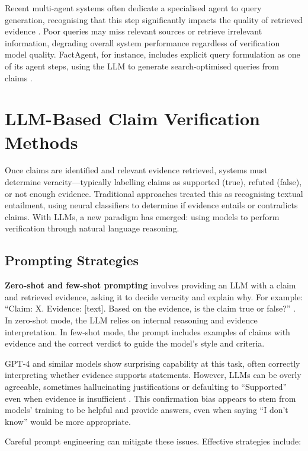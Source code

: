 \documentclass[12pt,a4paper]{article}
\begin{document}
Recent multi-agent systems often dedicate a specialised agent to query generation, recognising that this step significantly impacts the quality of retrieved evidence \citep{hysonlab2025factagent}. Poor queries may miss relevant sources or retrieve irrelevant information, degrading overall system performance regardless of verification model quality. FactAgent, for instance, includes explicit query formulation as one of its agent steps, using the LLM to generate search-optimised queries from claims \citep{hysonlab2025factagent}.

\section{LLM-Based Claim Verification Methods}

Once claims are identified and relevant evidence retrieved, systems must determine veracity—typically labelling claims as supported (true), refuted (false), or not enough evidence. Traditional approaches treated this as recognising textual entailment, using neural classifiers to determine if evidence entails or contradicts claims. With LLMs, a new paradigm has emerged: using models to perform verification through natural language reasoning.

\subsection{Prompting Strategies}

\textbf{Zero-shot and few-shot prompting} involves providing an LLM with a claim and retrieved evidence, asking it to decide veracity and explain why. For example: ``Claim: X. Evidence: [text]. Based on the evidence, is the claim true or false?'' \citep{zhang2023siren}. In zero-shot mode, the LLM relies on internal reasoning and evidence interpretation. In few-shot mode, the prompt includes examples of claims with evidence and the correct verdict to guide the model's style and criteria.

GPT-4 and similar models show surprising capability at this task, often correctly interpreting whether evidence supports statements. However, LLMs can be overly agreeable, sometimes hallucinating justifications or defaulting to ``Supported'' even when evidence is insufficient \citep{zhang2023siren}. This confirmation bias appears to stem from models' training to be helpful and provide answers, even when saying ``I don't know'' would be more appropriate.

Careful prompt engineering can mitigate these issues. Effective strategies include:
\end{document}

